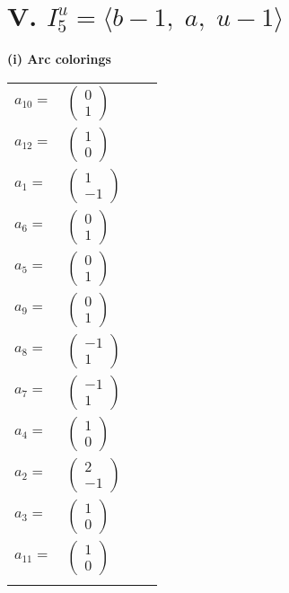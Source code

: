 \documentclass[1p]{elsarticle_modified}
\theoremstyle{definition}
\begin{document}
\centering \section*{V. $I^u_{5}= \langle b-1,\;a,\;u-1 \rangle$}
\flushleft \textbf{(i) Arc colorings}\\
\begin{tabular}{m{7pt} m{180pt} m{7pt} m{180pt} }
\flushright $a_{10}=$&$\begin{pmatrix}0\\1\end{pmatrix}$ \\
\flushright $a_{12}=$&$\begin{pmatrix}1\\0\end{pmatrix}$ \\
\flushright $a_{1}=$&$\begin{pmatrix}1\\-1\end{pmatrix}$ \\
\flushright $a_{6}=$&$\begin{pmatrix}0\\1\end{pmatrix}$ \\
\flushright $a_{5}=$&$\begin{pmatrix}0\\1\end{pmatrix}$ \\
\flushright $a_{9}=$&$\begin{pmatrix}0\\1\end{pmatrix}$ \\
\flushright $a_{8}=$&$\begin{pmatrix}-1\\1\end{pmatrix}$ \\
\flushright $a_{7}=$&$\begin{pmatrix}-1\\1\end{pmatrix}$ \\
\flushright $a_{4}=$&$\begin{pmatrix}1\\0\end{pmatrix}$ \\
\flushright $a_{2}=$&$\begin{pmatrix}2\\-1\end{pmatrix}$ \\
\flushright $a_{3}=$&$\begin{pmatrix}1\\0\end{pmatrix}$ \\
\flushright $a_{11}=$&$\begin{pmatrix}1\\0\end{pmatrix}$\\&\end{tabular}
\end{document}
